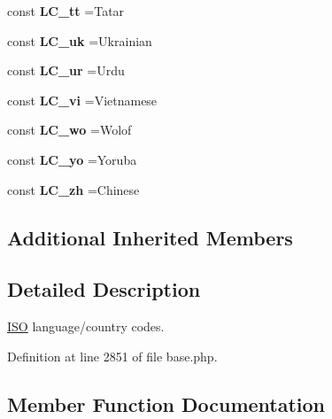 \begin{DoxyCompactItemize}
const {\bfseries L\+C\+\_\+tt} =\textquotesingle{}Tatar\textquotesingle{}
\item 
\hypertarget{class_i_s_o_a4314eff4b1a41db61744685810ccc492}{}\label{class_i_s_o_a4314eff4b1a41db61744685810ccc492} 
const {\bfseries L\+C\+\_\+uk} =\textquotesingle{}Ukrainian\textquotesingle{}
\item 
\hypertarget{class_i_s_o_a84b7ebffb86ed967d13226a60fb2407e}{}\label{class_i_s_o_a84b7ebffb86ed967d13226a60fb2407e} 
const {\bfseries L\+C\+\_\+ur} =\textquotesingle{}Urdu\textquotesingle{}
\item 
\hypertarget{class_i_s_o_aee4026d0499b6015044111ebd3518b5c}{}\label{class_i_s_o_aee4026d0499b6015044111ebd3518b5c} 
const {\bfseries L\+C\+\_\+vi} =\textquotesingle{}Vietnamese\textquotesingle{}
\item 
\hypertarget{class_i_s_o_a9a634965ec8e85a4c3968a78ec7c23cc}{}\label{class_i_s_o_a9a634965ec8e85a4c3968a78ec7c23cc} 
const {\bfseries L\+C\+\_\+wo} =\textquotesingle{}Wolof\textquotesingle{}
\item 
\hypertarget{class_i_s_o_a3a566c59b485b7639893c8e11ab63889}{}\label{class_i_s_o_a3a566c59b485b7639893c8e11ab63889} 
const {\bfseries L\+C\+\_\+yo} =\textquotesingle{}Yoruba\textquotesingle{}
\item 
\hypertarget{class_i_s_o_ad50d0a551419a9f58b320dd09290d758}{}\label{class_i_s_o_ad50d0a551419a9f58b320dd09290d758} 
const {\bfseries L\+C\+\_\+zh} =\textquotesingle{}Chinese\textquotesingle{}
\end{DoxyCompactItemize}

\subsection*{Additional Inherited Members}


\subsection{Detailed Description}
\hyperlink{class_i_s_o}{I\+SO} language/country codes. 

Definition at line 2851 of file base.\+php.



\subsection{Member Function Documentation}
\hypertarget{class_i_s_o_a662d2f9a4067a75b295cff7ff65d658f}{}\label{class_i_s_o_a662d2f9a4067a75b295cff7ff65d658f} 
